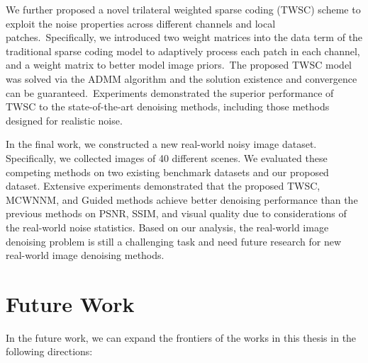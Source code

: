 We further proposed a novel trilateral weighted sparse coding (TWSC) scheme to exploit the noise properties across different channels and local patches.\ Specifically, we introduced two weight matrices into the data term of the traditional sparse coding model to adaptively process each patch in each channel, and a weight matrix to better model image priors.\ The proposed TWSC model was solved via the ADMM algorithm and the solution existence and convergence can be guaranteed.\ Experiments demonstrated the superior performance of TWSC to the state-of-the-art denoising methods, including those methods designed for realistic noise.

In the final work, we constructed a new real-world noisy image dataset. Specifically, we collected images of 40 different scenes. We evaluated these competing methods on two existing benchmark datasets and our proposed dataset. Extensive experiments demonstrated that the proposed TWSC, MCWNNM, and Guided methods achieve better denoising performance than the previous methods on PSNR, SSIM, and visual quality due to considerations of the real-world noise statistics. Based on our analysis, the real-world image denoising problem is still a challenging task and need future research for new real-world image denoising methods.

\section{Future Work}
\label{sec:conclusions:future}

In the future work, we can expand the frontiers of the works in this thesis in the following directions:

